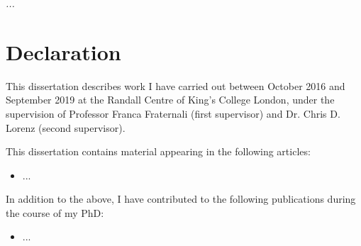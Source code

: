\cleardoublepage


\makeatletter
\renewcommand{\@pnumwidth}{2em}
\renewcommand{\@tocrmarg}{3em}
\setlength{\cftbeforechapterskip}{.9em}
\makeatother


\thispagestyle{empty}

\begin{vplace}[0.15]

\begin{center}
\it{...}
\end{center} 

\end{vplace}



\cleardoublepage
\newpage
\thispagestyle{plain} %
\mbox{}


\thispagestyle{empty}
\chapter*{Declaration}


\noindent This dissertation describes work I have carried out between October 2016 and September 2019 at the Randall Centre of King's College London, under the supervision of Professor Franca Fraternali (first supervisor) and Dr. Chris D. Lorenz (second supervisor).

\vspace{.2cm}

\noindent This dissertation contains material appearing in the following articles:

\begin{itemize}
\item ...
\end{itemize}

\noindent In addition to the above, I have contributed to the following publications during the course of my PhD:

\begin{itemize}
%
\item ...
%
\end{itemize}
%



